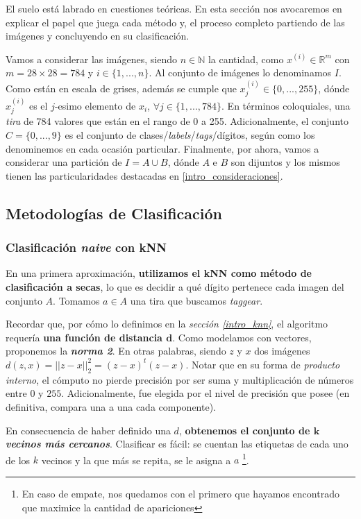 El suelo est\'a labrado en cuestiones te\'oricas. En esta secci\'on nos avocaremos en explicar el papel que juega cada m\'etodo y, el proceso completo partiendo de las im\'agenes y concluyendo en su clasificaci\'on.

Vamos a considerar las im\'agenes, siendo $n \in \mathbb{N}$ la cantidad, como $x^{(i)} \in \mathbb{R}^{m}$ con $m = 28 \times 28 = 784$ y $i \in \{1, ..., n\}$. Al conjunto de im\'agenes lo denominamos $I$. Como est\'an en escala de grises, adem\'as se cumple que $x^{(i)}_{j} \in \{0, ..., 255\}$, d\'onde $x^{(i)}_{j}$ es el $j$-esimo elemento de $x_{i}$, $\forall j \in \{1, ..., 784\}$. En t\'erminos coloquiales, una \textit{tira} de 784 valores que est\'an en el rango de 0 a 255. Adicionalmente, el conjunto $C = \{0, ..., 9\}$ es el conjunto de clases/\textit{labels}/\textit{tags}/d\'igitos, seg\'un como los denominemos en cada ocasi\'on particular. Finalmente, por ahora, vamos a considerar una partici\'on de $I = A \cup B$, d\'onde $A$ e $B$ son dijuntos y los mismos tienen las particularidades destacadas en \ref{intro_consideraciones}.

\subsection{Metodolog\'ias de Clasificaci\'on}

\subsubsection{Clasificaci\'on \textit{naive} con kNN}

En una primera aproximaci\'on, \textbf{utilizamos el kNN como m\'etodo de clasificaci\'on a secas}, lo que es decidir a qu\'e d\'igito pertenece cada imagen del conjunto $A$. Tomamos $a \in A$ una tira que buscamos \textit{taggear}.

Recordar que, por c\'omo lo definimos en la \textit{secci\'on \ref{intro_knn}}, el algoritmo requer\'ia \textbf{una funci\'on de distancia $\mathbf{d}$}. Como modelamos con vectores, proponemos la \textbf{\textit{norma 2}}. En otras palabras, siendo $z$ y $x$ dos im\'agenes $d(z,x) = \vert\vert z - x \vert\vert_2^2 = (z - x)^{t}(z - x)$. Notar que en su forma de \textit{producto interno}, el c\'omputo no pierde precisi\'on por ser suma y multiplicaci\'on de n\'umeros entre $0$ y $255$. Adicionalmente, fue elegida por el nivel de precisi\'on que posee (en definitiva, compara una a una cada componente). 

En consecuencia de haber definido una $d$, \textbf{obtenemos el conjunto de \textit{$\mathbf{k}$ vecinos m\'as cercanos}}. Clasificar es f\'acil: se cuentan las etiquetas de cada uno de los $k$ vecinos y la que m\'as se repita, se le asigna a $a$ \footnote{En caso de empate, nos quedamos con el primero que hayamos encontrado que maximice la cantidad de apariciones}.

